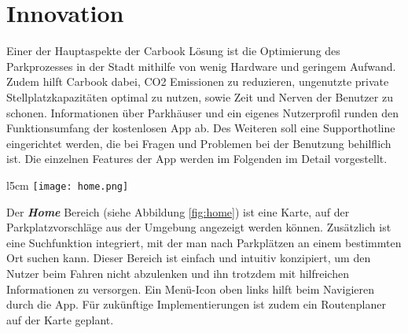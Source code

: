 \documentclass[12pt,ngerman, fleqn]{book} %
\begin{document}
%    
%    

\section{Innovation}
Einer der Hauptaspekte der Carbook Lösung ist die Optimierung des Parkprozesses in der Stadt mithilfe von wenig Hardware und geringem Aufwand. Zudem hilft Carbook dabei, CO2 Emissionen zu reduzieren, ungenutzte private Stellplatzkapazitäten optimal zu nutzen, sowie Zeit und Nerven der Benutzer zu schonen. Informationen über Parkhäuser und ein eigenes Nutzerprofil runden den Funktionsumfang der kostenlosen App ab. Des Weiteren soll eine Supporthotline eingerichtet werden, die bei Fragen und Problemen bei der Benutzung behilflich ist.
Die einzelnen Features der App werden im Folgenden im Detail vorgestellt. \\[55]


\begin{wrapfigure}[11]{l}{5cm}%
\vspace{-70pt}
\centering
\texttt{[image: home.png]}
\caption{\label{fig:home} Home screen.}
\end{wrapfigure}
Der \textbf{\textit{Home}} Bereich (siehe Abbildung \ref{fig:home}) ist eine Karte, auf der Parkplatzvorschläge aus der Umgebung angezeigt werden können. Zusätzlich ist eine Suchfunktion integriert, mit der man nach Parkplätzen an einem bestimmten Ort suchen kann. Dieser Bereich ist einfach und intuitiv konzipiert, um den Nutzer beim Fahren nicht abzulenken und ihn trotzdem mit hilfreichen Informationen zu versorgen. Ein Menü-Icon oben links hilft beim Navigieren durch die App. Für zukünftige Implementierungen ist zudem ein Routenplaner auf der Karte geplant. \newpage
\end{document}
